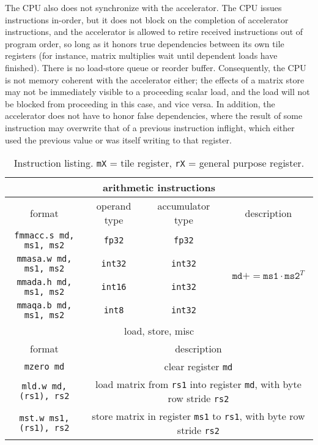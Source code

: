 \documentclass[acmsmall, nonacm=true]{acmart}
\newcommand{\pluseq}{\mathrel{{+}{=}}}
\begin{document}
The CPU also does not synchronize with the accelerator. The CPU issues instructions in-order, but it does not block on the completion of accelerator instructions, and the accelerator is allowed to retire received instructions out of program order, so long as it honors true dependencies between its own tile registers (for instance, matrix multiplies wait until dependent loads have finished). There is no load-store queue or reorder buffer. Consequently, the CPU is not memory coherent with the accelerator either; the effects of a matrix store may not be immediately visible to a proceeding scalar load, and the load will not be blocked from proceeding in this case, and vice versa. 
In addition, the accelerator does not have to honor false dependencies, where the result of some instruction may overwrite that of a previous instruction inflight, which either used the previous value or was itself writing to that register.

\begin{table}[h]
\begin{tabular}{|c|c|c|c|}
\multicolumn{4}{c}{arithmetic instructions} \\ \hline\hline
format & operand type & accumulator type & description \\ \hline
\verb|fmmacc.s md, ms1, ms2| & \verb|fp32| & \verb|fp32|  & \multirow{4}{*}{$\texttt{md} \pluseq \texttt{ms1}\cdot \texttt{ms2}^T$} \\ 
\verb|mmasa.w md, ms1, ms2| & \verb|int32| & \verb|int32| & \\
\verb|mmada.h md, ms1, ms2| & \verb|int16| & \verb|int32| & \\
\verb|mmaqa.b md, ms1, ms2| & \verb|int8| & \verb|int32| & \\
\hline\hline
\multicolumn{4}{c}{load, store, misc} \\ \hline\hline
format & \multicolumn{3}{c|}{description} \\ \hline
\verb|mzero md| & \multicolumn{3}{c|}{clear register \texttt{md}} \\
\verb|mld.w md, (rs1), rs2| & \multicolumn{3}{c|}{load matrix from \texttt{rs1} into register \texttt{md}, with byte row stride \texttt{rs2}} \\
\verb|mst.w ms1, (rs1), rs2| & \multicolumn{3}{c|}{store matrix in register \texttt{ms1} to \texttt{rs1}, with byte row stride \texttt{rs2}} \\ \hline
\end{tabular}
\caption{Instruction listing. \texttt{mX} = tile register, \texttt{rX} = general purpose register.}
\label{tbl:isa}
\end{table}
\end{document}

